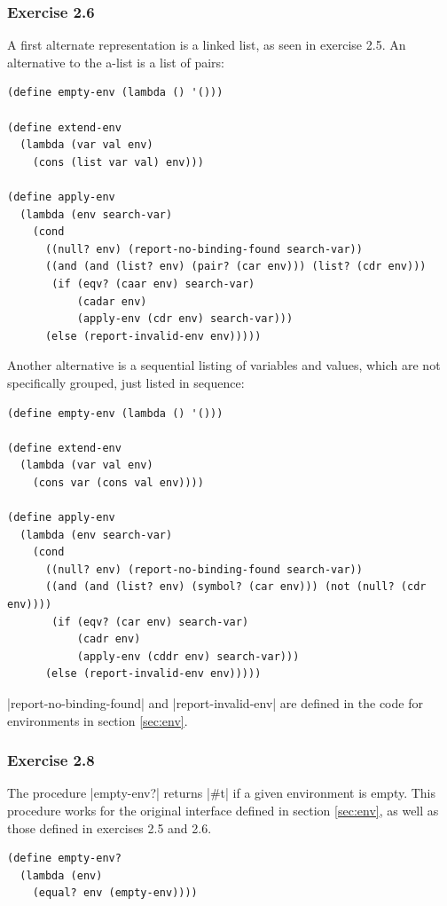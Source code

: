 \documentclass[a4paper]{article}
\begin{document}
\subsubsection{Exercise 2.6}

A first alternate representation is a linked list, as seen in exercise 2.5. An alternative to the a-list is a list of pairs:

\begin{lstlisting}
(define empty-env (lambda () '()))

(define extend-env
  (lambda (var val env)
    (cons (list var val) env)))

(define apply-env
  (lambda (env search-var)
    (cond
      ((null? env) (report-no-binding-found search-var))
      ((and (and (list? env) (pair? (car env))) (list? (cdr env)))
       (if (eqv? (caar env) search-var)
           (cadar env)
           (apply-env (cdr env) search-var)))
      (else (report-invalid-env env)))))
\end{lstlisting}

Another alternative is a sequential listing of variables and values, which are not specifically grouped, just listed in sequence:

\begin{lstlisting}
(define empty-env (lambda () '()))

(define extend-env
  (lambda (var val env)
    (cons var (cons val env))))

(define apply-env
  (lambda (env search-var)
    (cond
      ((null? env) (report-no-binding-found search-var))
      ((and (and (list? env) (symbol? (car env))) (not (null? (cdr env))))
       (if (eqv? (car env) search-var)
           (cadr env)
           (apply-env (cddr env) search-var)))
      (else (report-invalid-env env)))))
\end{lstlisting}

|report-no-binding-found| and |report-invalid-env| are defined in the code for environments in section \ref{sec:env}.

\subsubsection{Exercise 2.8}

The procedure |empty-env?| returns |#t| if a given environment is empty. This procedure works for the original interface defined in section \ref{sec:env}, as well as those defined in exercises 2.5 and 2.6.

\begin{lstlisting}
(define empty-env?
  (lambda (env)
    (equal? env (empty-env))))
\end{lstlisting}
\end{document}

